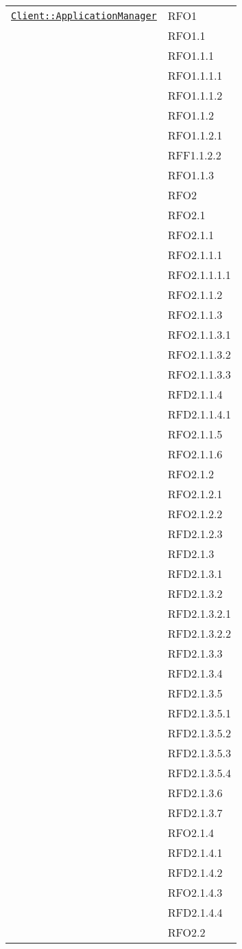 \begin{longtable}{|>{\centering}m{10cm}|m{3cm}<{\centering}|}
\hyperref[Client::ApplicationManager]{\texttt{Client::ApplicationManager}} & RFO1\\
& RFO1.1\\
& RFO1.1.1\\
& RFO1.1.1.1\\
& RFO1.1.1.2\\
& RFO1.1.2\\
& RFO1.1.2.1\\
& RFF1.1.2.2\\
& RFO1.1.3\\
& RFO2\\
& RFO2.1\\
& RFO2.1.1\\
& RFO2.1.1.1\\
& RFO2.1.1.1.1\\
& RFO2.1.1.2\\
& RFO2.1.1.3\\
& RFO2.1.1.3.1\\
& RFO2.1.1.3.2\\
& RFO2.1.1.3.3\\
& RFD2.1.1.4\\
& RFD2.1.1.4.1\\
& RFO2.1.1.5\\
& RFO2.1.1.6\\
& RFO2.1.2\\
& RFO2.1.2.1\\
& RFO2.1.2.2\\
& RFD2.1.2.3\\
& RFD2.1.3\\
& RFD2.1.3.1\\
& RFD2.1.3.2\\
& RFD2.1.3.2.1\\
& RFD2.1.3.2.2\\
& RFD2.1.3.3\\
& RFD2.1.3.4\\
& RFD2.1.3.5\\
& RFD2.1.3.5.1\\
& RFD2.1.3.5.2\\
& RFD2.1.3.5.3\\
& RFD2.1.3.5.4\\
& RFD2.1.3.6\\
& RFD2.1.3.7\\
& RFO2.1.4\\
& RFD2.1.4.1\\
& RFD2.1.4.2\\
& RFO2.1.4.3\\
& RFD2.1.4.4\\
& RFO2.2\\

\end{longtable}
